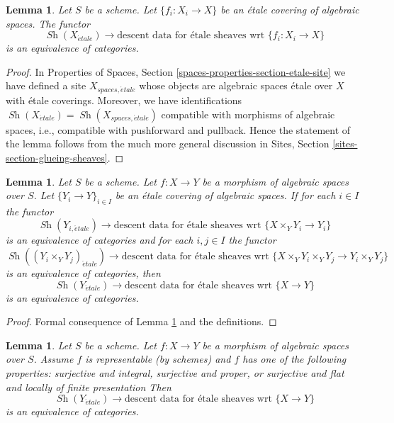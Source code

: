 \documentclass{stacks-project}
\theoremstyle{plain}
\newtheorem{lemma}[subsection]{Lemma}
\theoremstyle{definition}
\theoremstyle{remark}
\numberwithin{equation}{subsection}
\def\Sh{\mathop{\mathit{Sh}}\nolimits}
\def\etale{{\acute{e}tale}}
\begin{document}
\begin{lemma}
\label{lemma-glue-etale-sheaf-etale}
Let $S$ be a scheme. Let $\{f_i : X_i \to X\}$ be an \'etale covering of
algebraic spaces. The functor
$$
\Sh(X_\etale)
\longrightarrow
\text{descent data for \'etale sheaves wrt }\{f_i : X_i \to X\}
$$
is an equivalence of categories.
\end{lemma}

\begin{proof}
In Properties of Spaces, Section \ref{spaces-properties-section-etale-site}
we have defined a site $X_{spaces, \etale}$ whose objects
are algebraic spaces \'etale over $X$ with \'etale coverings.
Moreover, we have identifications
$\Sh(X_\etale) = \Sh(X_{spaces, \etale})$ compatible
with morphisms of algebraic spaces, i.e., compatible with
pushforward and pullback. Hence the statement of the lemma follows
from the much more general discussion in
Sites, Section \ref{sites-section-glueing-sheaves}.
\end{proof}

\begin{lemma}
\label{lemma-reduce-to-scheme-base}
Let $S$ be a scheme. Let $f : X \to Y$ be a morphism of
algebraic spaces over $S$. Let $\{Y_i \to Y\}_{i \in I}$ be an \'etale
covering of algebraic spaces. If for each $i \in I$ the functor
$$
\Sh(Y_{i, \etale})
\longrightarrow
\text{descent data for \'etale sheaves wrt }\{X \times_Y Y_i \to Y_i\}
$$
is an equivalence of categories and for each $i, j \in I$ the functor
$$
\Sh((Y_i \times_Y Y_j)_\etale)
\longrightarrow
\text{descent data for \'etale sheaves wrt }
\{X \times_Y Y_i \times_Y Y_j \to Y_i \times_Y Y_j\}
$$
is an equivalence of categories, then
$$
\Sh(Y_\etale)
\longrightarrow
\text{descent data for \'etale sheaves wrt }\{X \to Y\}
$$
is an equivalence of categories.
\end{lemma}

\begin{proof}
Formal consequence of Lemma \ref{lemma-glue-etale-sheaf-etale}
and the definitions.
\end{proof}

\begin{lemma}
\label{lemma-representable-case}
Let $S$ be a scheme. Let $f : X \to Y$ be a morphism of algebraic spaces
over $S$. Assume $f$ is representable (by schemes) and $f$
has one of the following properties:
surjective and integral,
surjective and proper, or
surjective and flat and locally of finite presentation
Then 
$$
\Sh(Y_\etale)
\longrightarrow
\text{descent data for \'etale sheaves wrt }\{X \to Y\}
$$
is an equivalence of categories.
\end{lemma}
\end{document}

